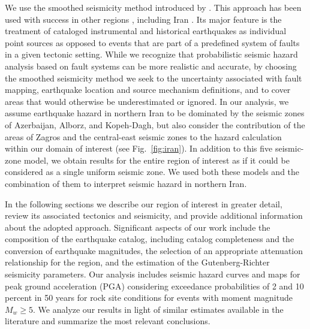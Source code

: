  We use the smoothed seismicity method introduced by \citet{Frankel1995}. This approach has been used with success in other regions \citep[e.g.][]{Cao1996, Akinci2004, Kalkan2009}, including Iran \citep{Khodaverdian_2016_BSSA}. Its major feature is the treatment of cataloged instrumental and historical earthquakes as individual point sources as opposed to events that are part of a predefined system of faults in a given tectonic setting. While we recognize that probabilistic seismic hazard analysis based on fault systems can be more realistic and accurate, by choosing the smoothed seismicity method we seek to  the uncertainty associated with fault mapping, earthquake location and source mechanism definitions, and to cover areas that would otherwise be underestimated or ignored. In our analysis, we assume earthquake hazard in northern Iran to be dominated by the seismic zones of Azerbaijan, Alborz, and Kopeh-Dagh, but also consider the contribution of the areas of Zagros and the central-east seismic zones to the hazard calculation within our domain of interest (see Fig.~\ref{fig:iran}). In addition to this five seismic-zone model, we obtain results for the entire region of interest as if it could be considered as a single uniform seismic zone. We used both these models and the combination of them to interpret seismic hazard in northern Iran.

In the following sections we describe our region of interest in greater detail, review its associated tectonics and seismicity, and provide additional information about the adopted approach. Significant aspects of our work include the composition of the earthquake catalog, including catalog completeness and the conversion of earthquake magnitudes, the selection of an appropriate attenuation relationship for the region, and the estimation of the Gutenberg-Richter seismicity parameters. Our analysis includes seismic hazard curves and maps for peak ground acceleration (PGA) considering exceedance probabilities of 2 and 10 percent in 50 years for rock site conditions for events with moment magnitude $M_w \geq 5$. We analyze our results in light of similar estimates available in the literature and summarize the most relevant conclusions.

